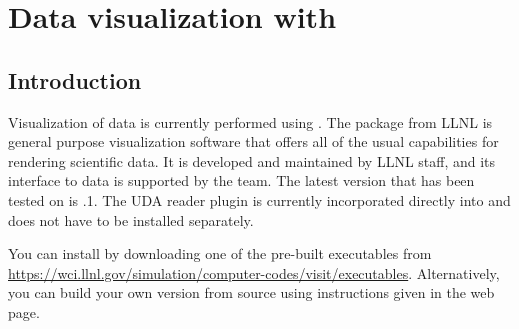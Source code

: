 \chapter{Data visualization with \Visit}

\section{Introduction}
Visualization of \Vaango data is currently performed using \Visit. 
The \Visit package from LLNL is general purpose visualization software
that offers all of the usual capabilities for rendering scientific
data.  It is developed and maintained by LLNL staff, and its
interface to \Vaango data is supported by the \Uintah team. The latest
\Visit version that \Vaango has been tested on is .1.
The UDA reader plugin is currently incorporated directly into \Visit
and does not have to be installed separately.

You can install \Visit by downloading one of the pre-built executables from
\url{https://wci.llnl.gov/simulation/computer-codes/visit/executables}.
Alternatively, you can build your own version from source using instructions 
given in the \Visit web page.

